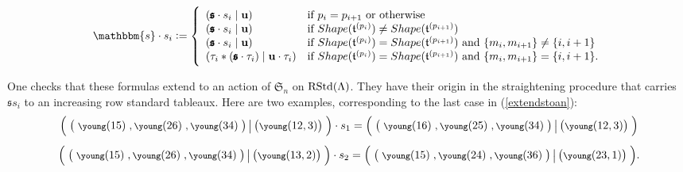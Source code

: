 \documentclass[10pt,a4,twoside,hidelinks,rm]{article}
\newcommand\es{\mathbbm{s}}
\newcommand\bu{\mathbf{u}}
\newcommand{\T}{\mathfrak{t}}
\newcommand{\Bs}{\pmb{\mathfrak{s}}}
\newcommand{\Si}{\mathfrak{S}}
\newcommand{\rstd}{{\rm RStd}}
\theoremstyle{plain}
\begin{document}
\begin{equation}\label{extendstoan}
  \es \cdot  s_i := \left\{
      \begin{array}{ll}
(\Bs \cdot s_i\mid \bu) & \mbox{if  } p_i = p_{i+1}   \mbox{ or otherwise    }  \\ (\Bs \cdot s_i\mid \bu)
& \mbox{if } Shape(\T^{(p_i)}) \neq Shape(\T^{(p_{i+1})})   \\ (\Bs \cdot s_i\mid \bu)
 & \mbox{if }  Shape(\T^{(p_i)}) = Shape(\T^{(p_{i+1})})
  \mbox{ and  }  \{ m_i , m_{i+1} \} \neq \{i,i+1\}  \\ 
  (\tau_i \ast(\Bs \cdot \tau_i) \mid \bu \cdot \tau_i)  &
  \mbox{if }   Shape(\T^{(p_i)}) = Shape(\T^{(p_{i+1})})
  \mbox{ and  }  \{ m_i , m_{i+1} \} = \{i,i+1\} .
  \end{array}
  \right.
\end{equation}


One checks that these formulas
extend to an action of $ \Si_n $ on $ \rstd(\Lambda) $.
They have their origin in the straightening procedure
that carries $ \Bs s_i $ to an increasing row standard tableaux. Here are two examples,
corresponding to the last case in (\ref{extendstoan}):\begin{equation}\begin{array}{c}
{\footnotesize\left(\;\left(\;\young(15)\;,\young(26)\;,\young(34)\;\right) \big|
  \left(  \young(12,3) \right)\;\right)} \cdot s_1 =
{\footnotesize\left(\;\left(\;\young(16)\;,\young(25)\;,\young(34)\;\right) \big|
  \left(  \young(12,3) \right)\;\right)}
\\[4mm]
{\footnotesize\left(\;\left(\;\young(15)\;,\young(26)\;,\young(34)\;\right) \big|
  \left(  \young(13,2) \right)\;\right)} \cdot s_2 =
{\footnotesize\left(\;\left(\;\young(15)\;,\young(24)\;,\young(36)\;\right) \big|
  \left(  \young(23,1) \right)\;\right)}.
\end{array}\end{equation}
\end{document}
